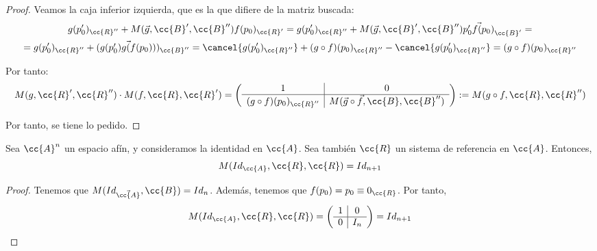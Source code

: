 \begin{proof}
    Veamos la caja inferior izquierda, que es la que difiere de la matriz buscada:
    \begin{multline*}
        g(p_0')_{\cc{R}''} + M(\vec{g},\cc{B}',\cc{B}'')f(p_0)_{\cc{R}'}
        = g(p_0')_{\cc{R}''} + M(\vec{g},\cc{B}',\cc{B}'')\vec{p_0'f(p_0)}_{\cc{B}'}
        =\\= g(p_0')_{\cc{R}''} + (\vec{g(p_0')g(f(p_0))})_{\cc{B}''}
        = \cancel{g(p_0')_{\cc{R}''}}+ (g\circ f)(p_0)_{\cc{R}''} - \cancel{g(p'_0)_{\cc{R}''}} = (g\circ f)(p_0)_{\cc{R}''}
    \end{multline*}

    Por tanto:
    \begin{equation*}
        M(g,\cc{R}', \cc{R}'')\cdot
        M(f,\cc{R}, \cc{R}') = \left(\begin{array}{c|c}
            1 & 0 \\ \hline
            (g\circ f)(p_0)_{\cc{R}''} &  M(\vec{g}\circ \vec{f},\cc{B},\cc{B}'')
        \end{array}\right)
        := M(g\circ f, \cc{R}, \cc{R}'')
    \end{equation*}

    Por tanto, se tiene lo pedido.
\end{proof}

\begin{prop}
    Sea $\cc{A}^n$ un espacio afín, y consideramos la identidad en $\cc{A}$. Sea también $\cc{R}$ un sistema de referencia en $\cc{A}$. Entonces,
    \begin{equation*}
        M(Id_{\cc{A}}, \cc{R}, \cc{R})
        = Id_{n+1}
    \end{equation*}
\end{prop}
\begin{proof}
    Tenemos que $M(Id_{\vec{\cc{A}}}, \cc{B})=Id_n$. Además, tenemos que $f(p_0)=p_0 \equiv 0_{\cc{R}}$. Por tanto,
    \begin{equation*}
        M(Id_{\cc{A}}, \cc{R}, \cc{R})
        = \left(\begin{array}{c|c}
            1 & 0 \\ \hline
            0 & I_n
        \end{array}\right) = Id_{n+1}
    \end{equation*}
\end{proof}

